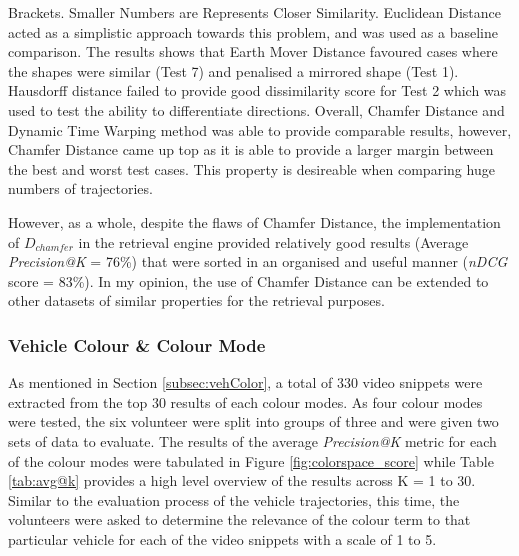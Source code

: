 \begin{landscape}
\begin{table}[]
{  Brackets. Smaller Numbers are Represents Closer Similarity. Euclidean Distance
  acted as a simplistic approach towards this problem, and was used as a
  baseline comparison. The results shows that Earth Mover Distance favoured
  cases where the shapes were similar (Test 7) and penalised a mirrored shape
  (Test 1). Hausdorff distance failed to provide good dissimilarity score for
  Test 2 which was used to test the ability to differentiate directions.
  Overall, Chamfer Distance and Dynamic Time Warping method was able to provide
  comparable results, however, Chamfer Distance came up top as it is able to
  provide a larger margin between the best and worst test cases. This property
  is desireable when comparing huge numbers of trajectories.}
\label{table:DistanceCompare}

\end{table}
\end{landscape}


However, as a whole, despite the flaws of Chamfer Distance, the implementation
of $D_{chamfer}$ in the retrieval engine provided relatively good results
(Average \textit{Precision@K} = 76\%) that were sorted in an organised and
useful manner (\textit{nDCG} score = 83\%). In my opinion, the use of Chamfer
Distance can be extended to other datasets of similar properties for the
retrieval purposes.

\subsubsection{Vehicle Colour \& Colour Mode}
\label{subsec:vehiclecolourchamferdistanceexperiment}

As mentioned in Section \ref{subsec:vehColor}, a total of 330 video snippets
were extracted from the top 30 results of each colour modes.  As four colour
modes were tested, the six volunteer were split into groups of three and were
given two sets of data to evaluate. The results of the average
\textit{Precision@K} metric for each of the colour modes were tabulated in
Figure \ref{fig:colorspace_score} while Table \ref{tab:avg@k} provides a high
level overview of the results across K = 1 to 30. Similar to the evaluation
process of the vehicle trajectories, this time, the volunteers were asked to
determine the relevance of the colour term to that particular vehicle for each
of the video snippets with a scale of 1 to 5.

